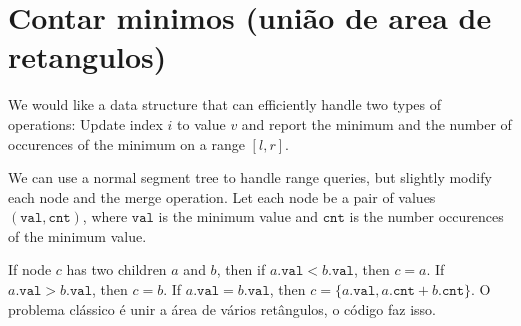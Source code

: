 \section{Contar minimos (união de area de retangulos)}

We would like a data structure that can efficiently handle two types of operations: Update index $i$ to value $v$ and report the minimum and the number of occurences of the minimum on a range $[l, r]$.

We can use a normal segment tree to handle range queries, but slightly modify each node and the merge operation. Let each node be a pair of values $(\texttt{val}, \texttt{cnt})$, where $\texttt{val}$ is the minimum value and $\texttt{cnt}$ is the number occurences of the minimum value.

If node $c$ has two children $a$ and $b$, then if $a.\texttt{val} < b.\texttt{val}$, then $c = a$.
If $a.\texttt{val} > b.\texttt{val}$, then $c = b$.
If $a.\texttt{val} = b.\texttt{val}$, then $c = \{a.\texttt{val}, a.\texttt{cnt} + b.\texttt{cnt}\}$. O problema clássico é unir a área de vários retângulos, o código faz isso.

